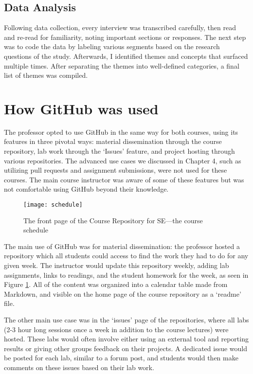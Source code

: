 \subsection{Data Analysis}
Following data collection, every interview was transcribed carefully, then read and re-read for familiarity, noting important sections or responses. The next step was to code the data by labeling various segments based on the research questions of the study. Afterwards, I identified themes and concepts that surfaced multiple times. After separating the themes into well-defined categories, a final list of themes was compiled.



\section{How GitHub was used}
The professor opted to use GitHub in the same way for both courses, using its features in three pivotal ways: material dissemination through the course repository, lab work through the `Issues' feature, and project hosting through various repositories. The advanced use cases we discussed in Chapter 4, such as utilizing pull requests and assignment submissions, were not used for these courses. The main course instructor was aware of some of these features but was not comfortable using GitHub beyond their knowledge.

\begin{figure}[h!]
 \caption{The front page of the Course Repository for SE---the course schedule}
 \centering
   \texttt{[image: schedule]}
 \label{fig:schedule}
\end{figure}

The main use of GitHub was for material dissemination: the professor hosted a repository which all students could access to find the work they had to do for any given week. The instructor would update this repository weekly, adding lab assignments, links to readings, and the student homework for the week, as seen in Figure \ref{fig:schedule}. All of the content was organized into a calendar table made from Markdown, and visible on the home page of the course repository as a `readme' file.

The other main use case was in the `issues' page of the repositories, where all labs (2-3 hour long sessions once a week in addition to the course lectures) were hosted. These labs would often involve either using an external tool and reporting results or giving other groups feedback on their projects. A dedicated issue would be posted for each lab, similar to a forum post, and students would then make comments on these issues based on their lab work.

